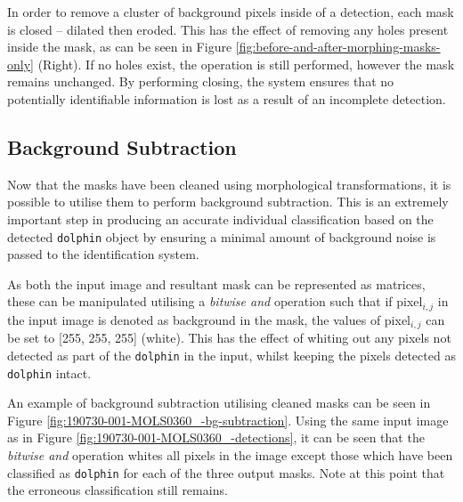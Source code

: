 In order to remove a cluster of background pixels inside of a detection, each mask is closed -- dilated then eroded. This has the effect of removing any holes present inside the mask, as can be seen in Figure \ref{fig:before-and-after-morphing-masks-only} (Right). If no holes exist, the operation is still performed, however the mask remains unchanged. By performing closing, the system ensures that no potentially identifiable information is lost as a result of an incomplete detection. 

\subsection{Background Subtraction}\label{ch:cetDet,sec:postProcessing,sub:bgExtraction}

Now that the masks have been cleaned using morphological transformations, it is possible to utilise them to perform background subtraction. This is an extremely important step in producing an accurate individual classification based on the detected \texttt{dolphin} object by ensuring a minimal amount of background noise is passed to the identification system.

As both the input image and resultant mask can be represented as matrices, these can be manipulated utilising a \textit{bitwise and} operation such that if pixel$_{i, j}$ in the input image is denoted as background in the mask, the values of pixel$_{i, j}$ can be set to [255, 255, 255] (white). This has the effect of whiting out any pixels not detected as part of the \texttt{dolphin} in the input, whilst keeping the pixels detected as \texttt{dolphin} intact.

An example of background subtraction utilising cleaned masks can be seen in Figure \ref{fig:190730-001-MOLS0360_-bg-subtraction}. Using the same input image as in Figure \ref{fig:190730-001-MOLS0360_-detections}, it can be seen that the \textit{bitwise and} operation whites all pixels in the image except those which have been classified as \texttt{dolphin} for each of the three output masks. Note at this point that the erroneous classification still remains. 

